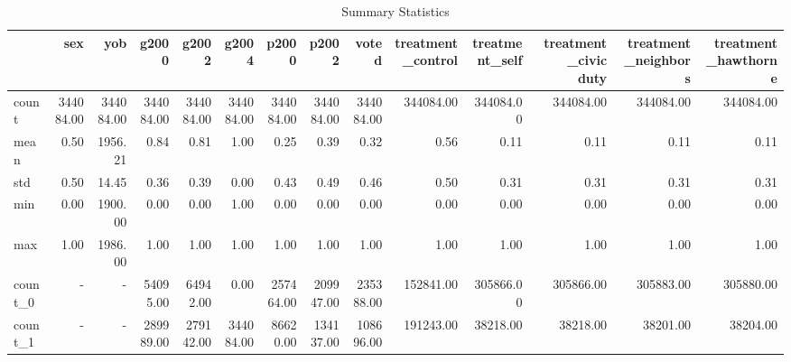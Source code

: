 \begin{table}
\caption{Summary Statistics}
\label{tab:summary_stats}
\begin{tabular}{lrrrrrrrrrrrrr}
\toprule
 & sex & yob & g2000 & g2002 & g2004 & p2000 & p2002 & voted & treatment_control & treatment_self & treatment_civic duty & treatment_neighbors & treatment_hawthorne \\
\midrule
count & 344084.00 & 344084.00 & 344084.00 & 344084.00 & 344084.00 & 344084.00 & 344084.00 & 344084.00 & 344084.00 & 344084.00 & 344084.00 & 344084.00 & 344084.00 \\
mean & 0.50 & 1956.21 & 0.84 & 0.81 & 1.00 & 0.25 & 0.39 & 0.32 & 0.56 & 0.11 & 0.11 & 0.11 & 0.11 \\
std & 0.50 & 14.45 & 0.36 & 0.39 & 0.00 & 0.43 & 0.49 & 0.46 & 0.50 & 0.31 & 0.31 & 0.31 & 0.31 \\
min & 0.00 & 1900.00 & 0.00 & 0.00 & 1.00 & 0.00 & 0.00 & 0.00 & 0.00 & 0.00 & 0.00 & 0.00 & 0.00 \\
max & 1.00 & 1986.00 & 1.00 & 1.00 & 1.00 & 1.00 & 1.00 & 1.00 & 1.00 & 1.00 & 1.00 & 1.00 & 1.00 \\
count_0 & - & - & 54095.00 & 64942.00 & 0.00 & 257464.00 & 209947.00 & 235388.00 & 152841.00 & 305866.00 & 305866.00 & 305883.00 & 305880.00 \\
count_1 & - & - & 289989.00 & 279142.00 & 344084.00 & 86620.00 & 134137.00 & 108696.00 & 191243.00 & 38218.00 & 38218.00 & 38201.00 & 38204.00 \\
\bottomrule
\end{tabular}
\end{table}
